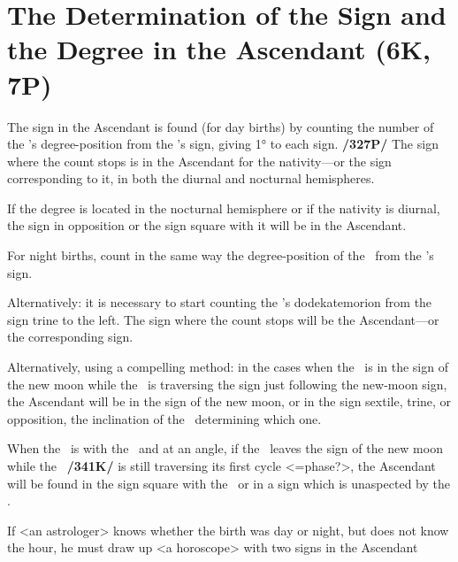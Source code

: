 \section{The Determination of the Sign and the Degree in the Ascendant (6K, 7P)}
The sign in the Ascendant is found (for day births) by counting the number of the \Sun's degree-position from the \Sun's sign, giving 1° to each sign. \textbf{/327P/} The sign where the count stops is in the Ascendant for the nativity—or the sign corresponding to it, in both the diurnal and nocturnal hemispheres. 

If the degree is located in the nocturnal hemisphere or if the nativity is diurnal, the sign in opposition or the sign square with it will be in the Ascendant. 

For night births, count in the same way the degree-position of the \Moon\, from the \Moon’s sign. 

Alternatively: it is necessary to start counting the \Sun’s dodekatemorion from the sign trine to the left. The sign where the count stops will be the Ascendant—or the corresponding sign.

Alternatively, using a compelling method: in the cases when the \Sun\, is in the sign of the new moon while the \Moon\, is traversing the sign just following the new-moon sign, the Ascendant will be in the sign of the new moon, or in the sign sextile, trine, or opposition, the inclination of the \Moon\, determining which one. 

When the \Moon\, is with the \Sun\, and at an angle, if the \Sun\, leaves the sign of the new moon while the \Moon\, \textbf{/341K/} is still traversing its first cycle <=phase?>, the Ascendant will be found in the sign square with the \Moon\, or in a sign which is unaspected by the \Moon. 

If <an astrologer> knows whether the birth was day or night, but does not know the hour, he must draw up <a horoscope> with two signs in the Ascendant

\newpage
